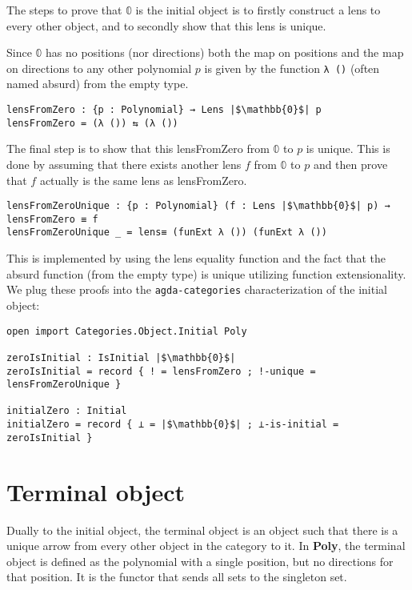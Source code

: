 The steps to prove that $\mathbb{0}$ is the initial object is to firstly construct a lens to every other object, and to secondly show that this lens is unique. 

Since $\mathbb{0}$ has no positions (nor directions) both the map on positions and the map on directions to any other polynomial $p$ is given by the function \texttt{λ ()} (often named absurd) from the empty type.
\begin{verbatim}
lensFromZero : {p : Polynomial} → Lens |$\mathbb{0}$| p
lensFromZero = (λ ()) ⇆ (λ ())
\end{verbatim}

The final step is to show that this lensFromZero from $\mathbb{0}$ to $p$ is unique. This is done by assuming that there exists another lens $f$ from $\mathbb{0}$ to $p$ and then prove that $f$ actually is the same lens as lensFromZero. 

\begin{verbatim}
lensFromZeroUnique : {p : Polynomial} (f : Lens |$\mathbb{0}$| p) → lensFromZero ≡ f
lensFromZeroUnique _ = lens≡ (funExt λ ()) (funExt λ ())
\end{verbatim}

This is implemented by using the lens equality function and the fact that the absurd function (from the empty type) is unique utilizing function extensionality. We plug these proofs into the \texttt{agda-categories} characterization of the initial object:

\begin{verbatim}
open import Categories.Object.Initial Poly

zeroIsInitial : IsInitial |$\mathbb{0}$|
zeroIsInitial = record { ! = lensFromZero ; !-unique = lensFromZeroUnique }

initialZero : Initial
initialZero = record { ⊥ = |$\mathbb{0}$| ; ⊥-is-initial = zeroIsInitial }
\end{verbatim}



\section{Terminal object}
Dually to the initial object, the terminal object is an object such that there is a unique arrow from every other object in the category to it. In \textbf{Poly}, the terminal object is defined as the polynomial with a single position, but no directions for that position. It is the functor that sends all sets to the singleton set.

